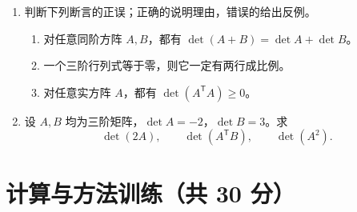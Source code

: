 \documentclass[UTF8,12pt,a4paper,fontset=fandol]{ctexart}
\begin{document}
\begin{enumerate}[label=\arabic*.,series=detquestions]
\item\label{q:true-false}
判断下列断言的正误；正确的说明理由，错误的给出反例。
\begin{enumerate}[label=(\arabic*)]
\item 对任意同阶方阵 $A,B$，都有 $\det(A+B)=\det A+\det B$。
\item 一个三阶行列式等于零，则它一定有两行成比例。
\item 对任意实方阵 $A$，都有 $\det(A^{\mathsf T}A)\geq0$。
\end{enumerate}

\item\label{q:product-scaling}
设 $A,B$ 均为三阶矩阵，$\det A=-2$，$\det B=3$。求
\[
\det(2A),\qquad \det(A^{\mathsf T}B),\qquad \det(A^2).
\]
\end{enumerate}

\section{计算与方法训练（共 30 分）}
\end{document}
